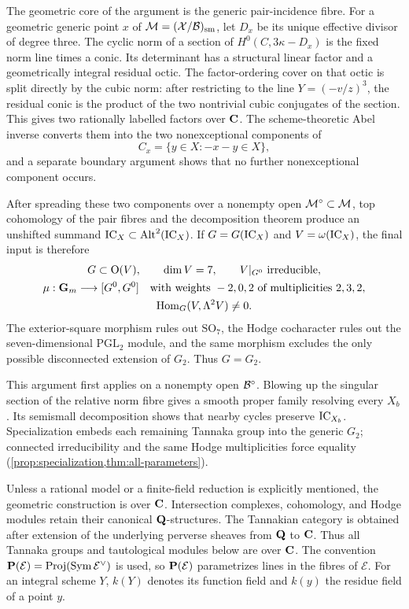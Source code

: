 The geometric core of the argument is the generic pair-incidence fibre.
For a geometric generic point $x$ of
$\mathcal M=(\mathcal X/\mathcal B)_{\mathrm{sm}}$, let $D_x$ be its unique effective divisor of
degree three.  The cyclic norm of a section of $H^0(C,3\kappa-D_x)$ is the
fixed norm line times a conic.  Its determinant has a structural linear
factor and a geometrically integral residual octic.  The factor-ordering
cover on that octic is split directly by the cubic norm: after restricting
to the line $Y=(-v/z)^3$, the residual conic is the product of the two
nontrivial cubic conjugates of the section.  This gives two rationally
labelled factors over $\mathbf C$.  The scheme-theoretic Abel inverse converts
them into the two nonexceptional components of
\[
 C_x=\{y\in X:-x-y\in X\},
\]
and a separate boundary argument shows that no further nonexceptional
component occurs.

After spreading these two components over a nonempty open
$\mathcal M^\circ\subset\mathcal M$, top cohomology of the pair fibres and the
decomposition theorem produce an unshifted summand
$\operatorname{IC}_X\subset\operatorname{Alt}^2(\operatorname{IC}_X)$.  If $G=G(\operatorname{IC}_X)$ and
$V=\omega(\operatorname{IC}_X)$, the final input is therefore
\[
 \begin{gathered}
 G\subset \mathrm{O}(V),\qquad \dim V=7,\qquad V|_{G^0}\ \text{irreducible},\\
 \mu:\GGm\longrightarrow [G^0,G^0]
 \quad\text{with weights }-2,0,2\text{ of multiplicities }2,3,2,\\
 \operatorname{Hom}_G(V,\Lambda^2V)\ne0.
 \end{gathered}
\]
The exterior-square morphism rules out $\mathrm{SO}_7$, the Hodge cocharacter rules
out the seven-dimensional $\mathrm{PGL}_2$ module, and the same morphism excludes the
only possible disconnected extension of $G_2$.  Thus $G=G_2$.

This argument first applies on a nonempty open $\mathcal B^\circ$.
Blowing up the singular section of the relative norm fibre gives a smooth
proper family resolving every $X_b$.  Its semismall decomposition shows
that nearby cycles preserve $\operatorname{IC}_{X_b}$.  Specialization embeds each
remaining Tannaka group into the generic $G_2$; connected irreducibility
and the same Hodge multiplicities force equality
(\cref{prop:specialization,thm:all-parameters}).

Unless a rational model or a finite-field reduction is explicitly mentioned,
the geometric construction is over $\mathbf C$.  Intersection complexes,
cohomology, and Hodge modules retain their canonical $\mathbf Q$-structures.  The
Tannakian category is obtained after extension of the underlying perverse
sheaves from $\mathbf Q$ to $\mathbf C$.  Thus all Tannaka groups and tautological
modules below are over $\mathbf C$.
The convention $\mathbf P(\mathcal E)=\operatorname{Proj}(\operatorname{Sym}\mathcal E^\vee)$ is used,
so $\mathbf P(\mathcal E)$ parametrizes lines in the fibres of $\mathcal E$.  For
an integral scheme $Y$, $k(Y)$ denotes its function field and $k(y)$ the
residue field of a point $y$.

